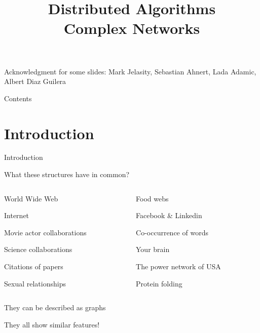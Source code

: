 
\title[DS - Complex Network]{\textbf{Distributed Algorithms}\\Complex Networks}



\newcommand{\Path}{\ell}
\newcommand{\Diam}{\mathit{diam}}

\begin{frame}
\titlepage

{\footnotesize
Acknowledgment for some slides: Mark Jelasity, Sebastian Ahnert, Lada Adamic, Albert Diaz Guilera
}


\end{frame}

\begin{frame}[shrink]{Contents}
\tableofcontents
\end{frame}


\section{Introduction}

\begin{frame}{Introduction}

\begin{block}{What these structures have in common?}

\begin{columns}
\begin{column}{0.5\textwidth}
\BI
\item World Wide Web
\item Internet
\item Movie actor collaborations
\item Science collaborations
\item Citations of papers
\item Sexual relationships
\EI
\end{column}
\begin{column}{0.5\textwidth}
\BI
\item Food webs
\item Facebook \& Linkedin
\item Co-occurrence of words
\item Your brain
\item The power network of USA
\item Protein folding
\EI
\end{column}
\end{columns}
\end{block}

\pause
\bigskip
\BI
\item They can be described as graphs
\pause
\item They all show similar features!
\EI

\end{frame}


